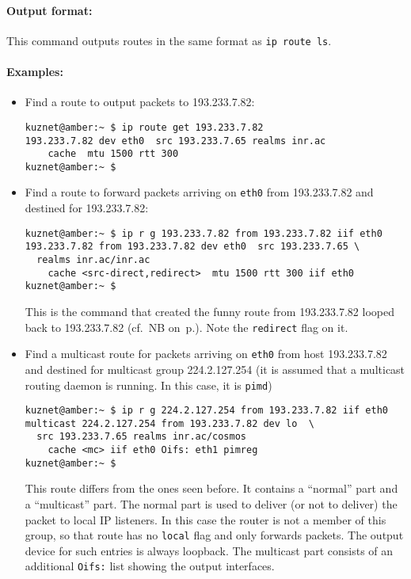 \paragraph{Output format:} This command outputs routes in the same
format as \verb|ip route ls|.

\paragraph{Examples:} 
\begin{itemize}
\item Find a route to output packets to 193.233.7.82:
\begin{verbatim}
kuznet@amber:~ $ ip route get 193.233.7.82
193.233.7.82 dev eth0  src 193.233.7.65 realms inr.ac
    cache  mtu 1500 rtt 300
kuznet@amber:~ $
\end{verbatim}

\item Find a route to forward packets arriving on \verb|eth0|
from 193.233.7.82 and destined for 193.233.7.82:
\begin{verbatim}
kuznet@amber:~ $ ip r g 193.233.7.82 from 193.233.7.82 iif eth0
193.233.7.82 from 193.233.7.82 dev eth0  src 193.233.7.65 \
  realms inr.ac/inr.ac 
    cache <src-direct,redirect>  mtu 1500 rtt 300 iif eth0
kuznet@amber:~ $
\end{verbatim}
\begin{NB}
  \label{NB-nature-of-strangeness}
  This is the command that created the funny route from 193.233.7.82
  looped back to 193.233.7.82 (cf.\ NB on~p.\pageref{NB-strange-route}).
  Note the \verb|redirect| flag on it.
\end{NB}

\item Find a multicast route for packets arriving on \verb|eth0|
from host 193.233.7.82 and destined for multicast group 224.2.127.254
(it is assumed that a multicast routing daemon is running.
In this case, it is \verb|pimd|)
\begin{verbatim}
kuznet@amber:~ $ ip r g 224.2.127.254 from 193.233.7.82 iif eth0
multicast 224.2.127.254 from 193.233.7.82 dev lo  \
  src 193.233.7.65 realms inr.ac/cosmos 
    cache <mc> iif eth0 Oifs: eth1 pimreg
kuznet@amber:~ $
\end{verbatim}
This route differs from the ones seen before. It contains a ``normal'' part
and a ``multicast'' part. The normal part is used to deliver (or not to
deliver) the packet to local IP listeners. In this case the router
is not a member
of this group, so that route has no \verb|local| flag and only
forwards packets. The output device for such entries is always loopback.
The multicast part consists of an additional \verb|Oifs:| list showing
the output interfaces.
\end{itemize}


